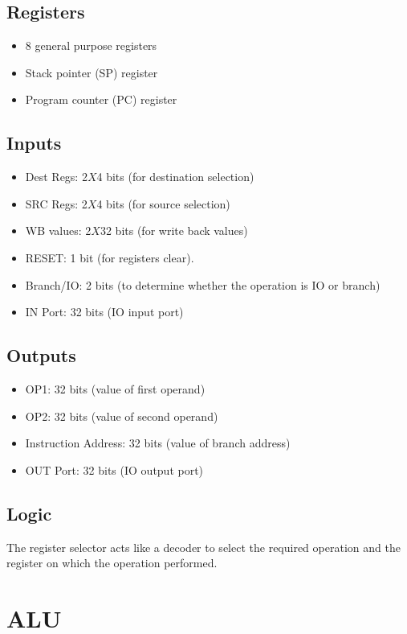 \documentclass[12pt]{report}
\begin{document}
\subsection{Registers}
\begin{itemize}
    \item 8 general purpose registers
    \item Stack pointer (SP) register
    \item Program counter (PC) register
\end{itemize}

\subsection{Inputs}
\begin{itemize}
    \item Dest Regs: 2$X$4 bits (for destination selection)
    \item SRC Regs: 2$X$4 bits (for source selection)
    \item WB values: 2$X$32 bits (for write back values)
    \item RESET: 1 bit (for registers clear).
    \item Branch/IO: 2 bits (to determine whether the operation is IO or branch)
    \item IN Port: 32 bits (IO input port)
\end{itemize}

\subsection{Outputs}
\begin{itemize}
    \item OP1: 32 bits (value of first operand)
    \item OP2: 32 bits (value of second operand)
    \item Instruction Address: 32 bits (value of branch address)
    \item OUT Port: 32 bits (IO output port)
\end{itemize}

\subsection{Logic}
The register selector acts like a decoder to select the required operation and the register on which the operation performed.

\section{ALU}
\end{document}
